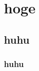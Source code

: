 \documentclass[a4paper, dvipdfmx]{jreport}	%
\begin{document}
\chapter{hoge}
\section{huhu}
\subsection{huhu}
\end{document}

